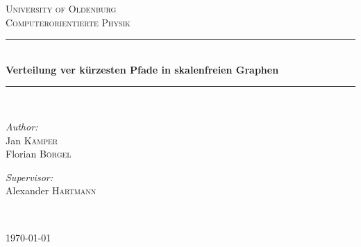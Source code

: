 \begin{titlepage}
\begin{center}


\textsc{\LARGE University of Oldenburg}\\[1.5cm]

\textsc{\Large Computerorientierte Physik}\\[0.5cm]


\newcommand{\HRule}{\rule{\linewidth}{0.5mm}}
\HRule \\[0.4cm]
{ \huge \bfseries Verteilung ver kürzesten Pfade in skalenfreien Graphen}\\[0.4cm]

\HRule \\[1.5cm]

\begin{minipage}{0.4\textwidth}
\begin{flushleft} \large
\emph{Author:}\\
Jan \textsc{K\"amper}\\
Florian \textsc{B\"orgel}
\end{flushleft}
\end{minipage}
\hfill
\begin{minipage}{0.4\textwidth}
\begin{flushright} \large
\emph{Supervisor:} \\
Alexander \textsc{Hartmann}
\end{flushright}
\end{minipage}
\\[3cm]
\vfill



{\large \today}

\end{center}

\end{titlepage}